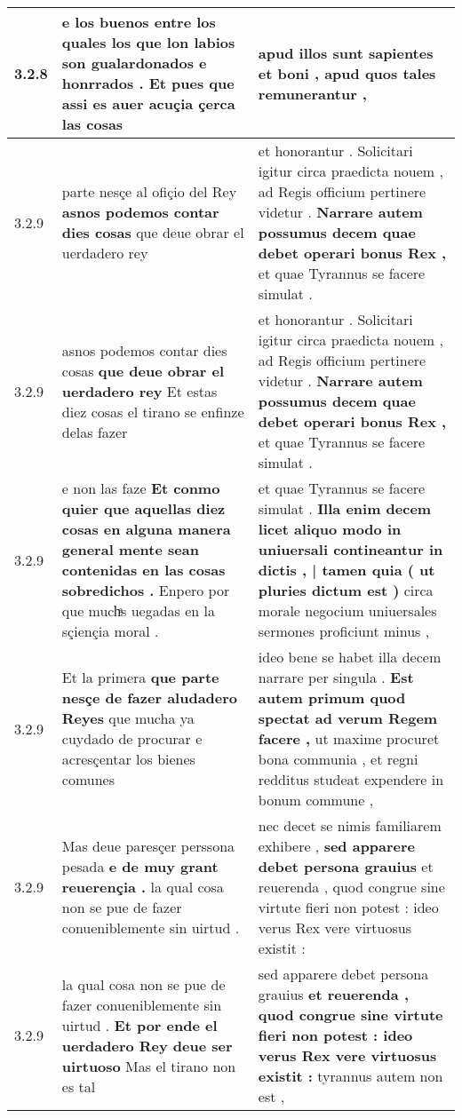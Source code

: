 \begin{tabular}{|p{1cm}|p{6.5cm}|p{6.5cm}|}
3.2.8 & e los buenos entre los quales \textbf{ los que lon labios son gualardonados e honrrados . } Et pues que assi es auer acuçia çerca las cosas & apud illos sunt sapientes et boni , \textbf{ apud } quos tales remunerantur , \\\hline
3.2.9 & parte nesçe al ofiçio del Rey \textbf{ asnos podemos contar dies cosas } que deue obrar el uerdadero rey & et honorantur . Solicitari igitur circa praedicta nouem , ad Regis officium pertinere videtur . \textbf{ Narrare autem possumus decem quae debet operari bonus Rex , } et quae Tyrannus se facere simulat . \\\hline
3.2.9 & asnos podemos contar dies cosas \textbf{ que deue obrar el uerdadero rey } Et estas diez cosas el tirano se enfinze delas fazer & et honorantur . Solicitari igitur circa praedicta nouem , ad Regis officium pertinere videtur . \textbf{ Narrare autem possumus decem quae debet operari bonus Rex , } et quae Tyrannus se facere simulat . \\\hline
3.2.9 & e non las faze \textbf{ Et conmo quier que aquellas diez cosas en alguna manera general mente sean contenidas en las cosas sobredichos . } Enpero por que muchͣs uegadas en la sçiençia moral . & et quae Tyrannus se facere simulat . \textbf{ Illa enim decem licet aliquo modo in uniuersali contineantur in dictis , | tamen quia ( ut pluries dictum est ) } circa morale negocium uniuersales sermones proficiunt minus , \\\hline
3.2.9 & Et la primera \textbf{ que parte nesçe de fazer aludadero Reyes } que mucha ya cuydado de procurar e acresçentar los bienes comunes & ideo bene se habet illa decem narrare per singula . \textbf{ Est autem primum quod spectat ad verum Regem facere , } ut maxime procuret bona communia , et regni redditus studeat expendere in bonum commune , \\\hline
3.2.9 & Mas deue paresçer perssona pesada \textbf{ e de muy grant reuerençia . } la qual cosa non se pue de fazer conueniblemente sin uirtud . & nec decet se nimis familiarem exhibere , \textbf{ sed apparere debet persona grauius } et reuerenda , quod congrue sine virtute fieri non potest : ideo verus Rex vere virtuosus existit : \\\hline
3.2.9 & la qual cosa non se pue de fazer conueniblemente sin uirtud . \textbf{ Et por ende el uerdadero Rey deue ser uirtuoso } Mas el tirano non es tal & sed apparere debet persona grauius \textbf{ et reuerenda , quod congrue sine virtute fieri non potest : ideo verus Rex vere virtuosus existit : } tyrannus autem non est , \\\hline

\end{tabular}
